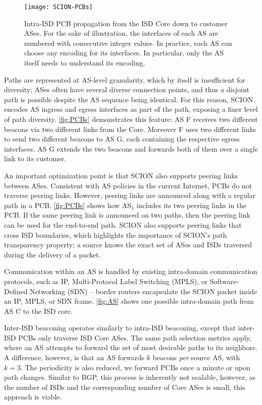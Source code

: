\documentclass[a4paper]{llncs}
\newcommand\SCION{{\small\textsf{SCION}}\xspace}
\newcommand\C{\textsf{C}\xspace}
\newcommand\F{\textsf{F}\xspace}
\newcommand\G{\textsf{G}\xspace}
\begin{document}
\begin{figure}[h]
  \centering
  \texttt{[image: SCION-PCBs]}
  \caption{Intra-ISD PCB propagation from the ISD Core down to customer ASes.
  For the sake of illustration, the interfaces of each AS are
  numbered with consecutive integer values. In practice, each AS can choose
  any encoding for its interfaces. In particular, only the
  AS itself needs to understand its encoding.}     \label{fig:PCBs}
\end{figure}


Paths are represented at AS-level granularity, which by itself is
insufficient for diversity; ASes often have several diverse
connection points, and thus a disjoint path is possible despite the
AS sequence being identical. For this reason, \SCION encodes AS
ingress and egress interfaces as part of the path, exposing a finer
level of path diversity. \autoref{fig:PCBs} demonstrates this
feature: AS \F receives two different beacons via two different links
from the Core. Moreover \F uses two different links to send two
different beacons to AS \G, each containing the respective egress
interfaces. AS \G extends the two beacons and forwards both of them
over a single link to its customer.

An important optimization point is that \SCION also supports peering
links between ASes. Consistent with AS policies in the current Internet, PCBs do
not traverse peering links. However, peering links are announced along with a
regular path in a PCB. \autoref{fig:PCBs} shows how AS$_1$ includes its two
peering links in the PCB. If the same peering link is announced on two paths, then
the peering link can be used for the end-to-end path. \SCION also supports
peering links that cross ISD boundaries, which highlights the importance of
\SCION{}'s path transparency property; a source knows the exact set of ASes and
ISDs traversed during the delivery of a packet.

Communication within an AS is handled by existing intra-domain communication
protocols, such as IP, Multi-Protocol Label Switching (MPLS), or Software-Defined
Networking (SDN) -- border routers encapsulate the \SCION packet inside an IP,
MPLS, or SDN frame.  \autoref{fig:AS} shows one possible intra-domain path from
AS \C to the ISD core.

Inter-ISD beaconing operates similarly to intra-ISD beaconing, except that
inter-ISD PCBs only traverse ISD Core ASes. The same path selection metrics
apply, where an AS attempts to forward the set of most desirable paths to its
neighbors. A difference, however, is that an AS forwards $k$ beacons
\textit{per} source AS, with $k=3$. The periodicity is also reduced, we forward
PCBs once a minute or upon path changes. Similar to BGP, this process is
inherently not scalable, however, as the number of ISDs and the corresponding
number of Core ASes is small, this approach is viable.
\end{document}
